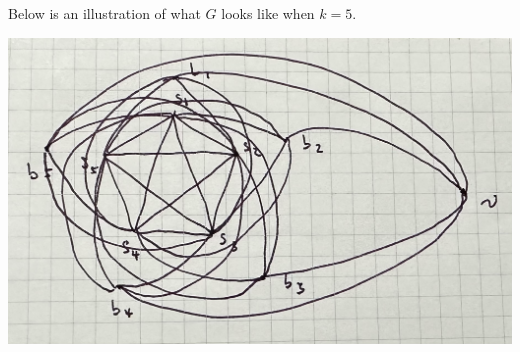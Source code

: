 \documentclass{article}
\begin{document}
\begin{enumerate}[label=(\alph*)]
    Below is an illustration of what $G$ looks like when $k = 5$.

    \includegraphics[width=.7\textwidth]{Q4714}
\end{enumerate}
\end{document}
